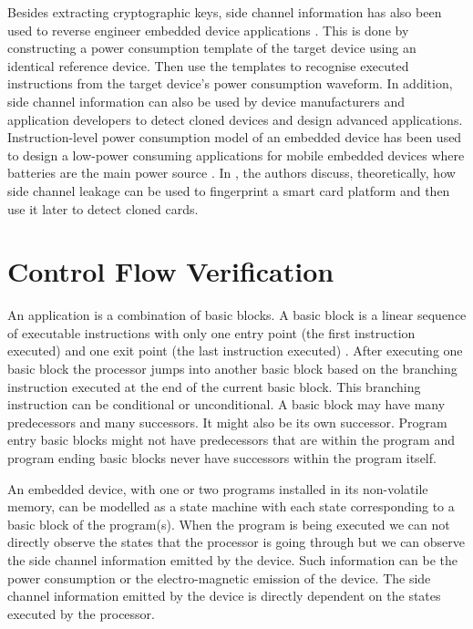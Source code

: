 \documentclass[lnicst]{svmultln}
\begin{document}
Besides extracting cryptographic keys, side channel information has also been used to reverse engineer embedded device applications \cite{WISTP-07-DMG,TCS-10-TCB,IACR-04-C}. This is done by constructing a power consumption template of the target device using an identical reference device. Then use the templates to recognise executed instructions from the target device's power consumption waveform. In addition, side channel information can also be used by device manufacturers and application developers to detect cloned devices and design advanced applications. Instruction-level power consumption model of an embedded device has been used to design a low-power consuming applications for mobile embedded devices where batteries are the main power source \cite{LCTES-01-SASN,IEEE-04-NPSC}. In \cite{ACT-06-KKC}, the authors discuss, theoretically, how side channel leakage can be used to fingerprint a smart card platform and then use it later to detect cloned cards.

\section{Control Flow Verification}
\label{sec:control-flow-verification}

An application is a combination of basic blocks. A basic block is a linear sequence of executable instructions with only one entry point (the first instruction executed) and one exit point (the last instruction executed) \cite{SIGPLAN-70-F}. After executing one basic block the processor jumps into another basic block based on the branching instruction executed at the end of the current basic block. This branching instruction can be conditional or unconditional. A basic block may have many predecessors and many successors. It might also be its own successor. Program entry basic blocks might not have predecessors that are within the program and program ending basic blocks never have successors within the program itself.

An embedded device, with one or two programs installed in its non-volatile memory, can be modelled as a state machine with each state corresponding to a basic block of the program(s). When the program is being executed we can not directly observe the states that the processor is going through but we can observe the side channel information emitted by the device. Such information can be the power consumption \cite{CRYPTO-99-PJB,IDTC-07-TSE} or the electro-magnetic emission \cite{CIS-11-KLXX,CT-RSA-12-JSBFG,CS-85-WN} of the device. The side channel information emitted by the device is directly dependent on the states executed by the  processor.
\end{document}
